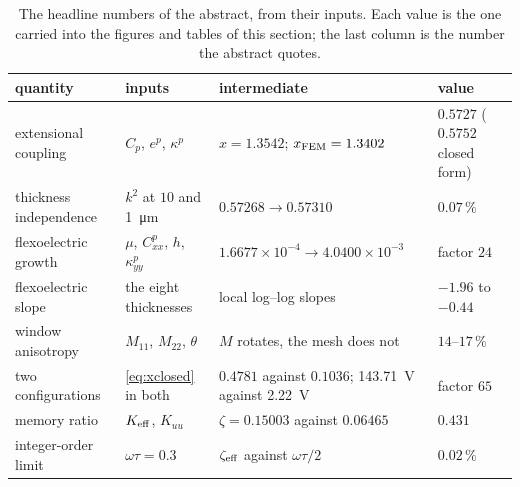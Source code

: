 \begin{table}[!htbp]
\centering
\small
\caption{The headline numbers of the abstract, from their inputs. Each value
is the one carried into the figures and tables of this section; the last column
is the number the abstract quotes.}
\label{tab:worked}
\begin{tabular}{@{}p{}p{}p{}p{}@{}}
\toprule
quantity & inputs & intermediate & value \\
\midrule
extensional coupling & $C_p$, $e^{p}$, $\kappa^{p}$ &
$x=1.3542$; $x_{\rm FEM}=1.3402$ & $0.5727$ ($0.5752$ closed form) \\
thickness independence & $k^2$ at $10$ and \SI{1}{\micro\meter} &
$0.57268\to0.57310$ & $0.07\,\%$ \\
flexoelectric growth & $\mu$, $C^{p}_{xx}$, $h$, $\kappa^{p}_{yy}$ &
$1.6677\times10^{-4}\to4.0400\times10^{-3}$ & factor $24$ \\
flexoelectric slope & the eight thicknesses & local log--log slopes &
$-1.96$ to $-0.44$ \\
window anisotropy & $M_{11}$, $M_{22}$, $\theta$ & $M$ rotates, the mesh does
not & $14$--$17\,\%$ \\
two configurations & \eqref{eq:xclosed} in both & $0.4781$ against $0.1036$;
\SI{143.71}{\volt} against \SI{2.22}{\volt} & factor $65$ \\
memory ratio & $K_{\rm eff}$, $K_{uu}$ & $\zeta=0.15003$ against $0.06465$ &
$0.431$ \\
integer-order limit & $\omega\tau=0.3$ & $\zeta_{\rm eff}$ against
$\omega\tau/2$ & $0.02\,\%$ \\
\bottomrule
\end{tabular}
\end{table}
